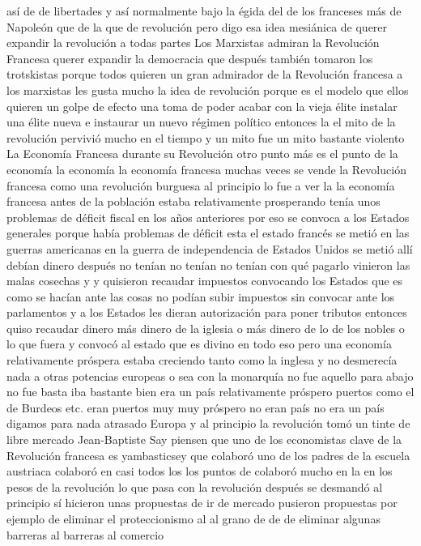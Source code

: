 así de de libertades y así normalmente bajo la égida del de los franceses
más de Napoleón que de la que de revolución pero digo esa idea mesiánica de querer expandir la revolución a todas partes
Los Marxistas admiran la Revolución Francesa
querer expandir la democracia que después también tomaron los trotskistas porque todos quieren un gran admirador de la Revolución francesa a los marxistas les gusta mucho la idea de revolución
porque es el modelo que ellos quieren un golpe de efecto una toma de poder acabar con la vieja élite instalar una élite nueva
e instaurar un nuevo régimen político entonces la el mito de la revolución pervivió mucho en el tiempo y un mito fue un mito bastante violento
La Economía Francesa durante su Revolución
otro punto más es el punto de la economía la economía la economía francesa
muchas veces se vende la Revolución francesa como una revolución burguesa al principio lo fue a ver la la economía francesa antes de la población
estaba relativamente prosperando tenía unos problemas de déficit fiscal en los años anteriores por eso se convoca a los Estados generales
porque había problemas de déficit esta el estado francés se metió en las guerras americanas en la guerra de independencia de Estados Unidos
se metió allí debían dinero después no tenían no tenían no tenían con qué pagarlo vinieron las malas cosechas y
y quisieron recaudar impuestos convocando los Estados que es como se hacían ante las cosas no podían subir impuestos
sin convocar ante los parlamentos y a los Estados les dieran autorización para poner tributos
entonces quiso recaudar dinero más dinero de la iglesia o más dinero de lo de los nobles o lo que fuera y convocó al estado que es divino en todo eso
pero una economía relativamente próspera estaba creciendo tanto como la inglesa y no desmerecía nada a otras potencias europeas
o sea con la monarquía no fue aquello para abajo no fue basta iba bastante bien
era un país relativamente próspero puertos como el de Burdeos etc. eran puertos muy muy próspero no eran país
no era un país digamos para nada atrasado Europa y al principio la revolución tomó un tinte de libre mercado
Jean-Baptiste Say
piensen que uno de los economistas clave de la Revolución francesa es yambasticsey que colaboró uno de los padres de la escuela austriaca
colaboró en casi todos los los puntos de colaboró mucho en la en los pesos de la revolución lo que pasa con la revolución después se desmandó
al principio sí hicieron unas propuestas de ir de mercado pusieron propuestas por ejemplo de eliminar
el proteccionismo al al grano de de de eliminar algunas barreras al barreras al comercio
